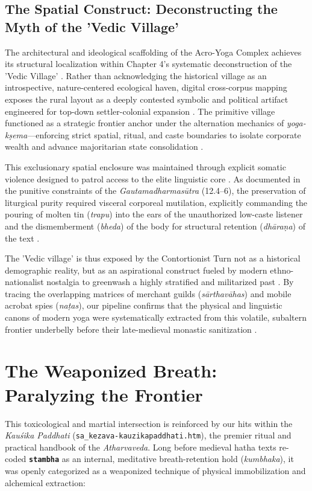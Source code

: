 \documentclass[11pt,letterpaper]{article}
\begin{document}
\subsection{The Spatial Construct: Deconstructing the Myth of the 'Vedic Village'}

The architectural and ideological scaffolding of the Acro-Yoga Complex achieves its structural localization within Chapter 4's systematic deconstruction of the 'Vedic Village' \cite{McCartney2026b}. Rather than acknowledging the historical village as an introspective, nature-centered ecological haven, digital cross-corpus mapping exposes the rural layout as a deeply contested symbolic and political artifact engineered for top-down settler-colonial expansion \cite{McCartney2026b}. The primitive village functioned as a strategic frontier anchor under the alternation mechanics of \textit{yoga-kṣema}---enforcing strict spatial, ritual, and caste boundaries to isolate corporate wealth and advance majoritarian state consolidation \cite{McCartney2026b}. 

This exclusionary spatial enclosure was maintained through explicit somatic violence designed to patrol access to the elite linguistic core \cite{McCartney2026b}. As documented in the punitive constraints of the \textit{Gautamadharmasūtra} (12.4--6), the preservation of liturgical purity required visceral corporeal mutilation, explicitly commanding the pouring of molten tin (\textit{trapu}) into the ears of the unauthorized low-caste listener and the dismemberment (\textit{bheda}) of the body for structural retention (\textit{dhāraṇa}) of the text \cite{McCartney2026b}. 

The 'Vedic village' is thus exposed by the Contortionist Turn not as a historical demographic reality, but as an aspirational construct fueled by modern ethno-nationalist nostalgia to greenwash a highly stratified and militarized past \cite{McCartney2026b}. By tracing the overlapping matrices of merchant guilds (\textit{sārthavāhas}) and mobile acrobat spies (\textit{naṭas}), our pipeline confirms that the physical and linguistic canons of modern yoga were systematically extracted from this volatile, subaltern frontier underbelly before their late-medieval monastic sanitization \cite{McCartney2026b}.


\section{The Weaponized Breath: Paralyzing the Frontier}
This toxicological and martial intersection is reinforced by our hits within the \textit{Kauśika Paddhati} (\texttt{sa\_kezava-kauzikapaddhati.htm}), the premier ritual and practical handbook of the \textit{Atharvaveda}. Long before medieval hatha texts re-coded \textbf{\texttt{stambha}} as an internal, meditative breath-retention hold (\textit{kumbhaka}), it was openly categorized as a weaponized technique of physical immobilization and alchemical extraction:
\end{document}
